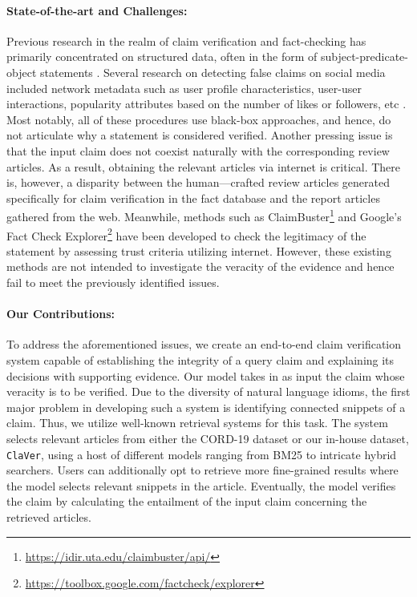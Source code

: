 \documentclass[11pt]{article}
\newcommand{\dataset}{\texttt{ClaVer}}
\begin{document}
\paragraph{State-of-the-art and Challenges:} Previous research in the realm of claim verification and fact-checking has primarily concentrated on structured data, often in the form of subject-predicate-object statements \cite{dong2015knowledge,nakashole2014language}. Several research on detecting false claims on social media included network metadata such as user profile characteristics, user-user interactions, popularity attributes based on the number of likes or followers, etc \cite{kumar2016disinformation,qazvinian2011rumor}. Most notably, all of these procedures use black-box approaches, and hence, do not articulate why a statement is considered verified. Another pressing issue is that the input claim does not coexist naturally with the corresponding review articles.
As a result, obtaining the relevant articles via internet is critical.
There is, however, a disparity between the human—crafted review articles generated specifically for claim verification in the fact database and the report articles gathered from the web. Meanwhile, methods such as ClaimBuster\footnote{\url{https://idir.uta.edu/claimbuster/api/}} and Google's Fact Check Explorer\footnote{\url{https://toolbox.google.com/factcheck/explorer}} have been developed to check the legitimacy of the statement by assessing trust criteria utilizing internet. However, these existing methods are not intended to investigate the veracity of the evidence and hence fail to meet the previously identified issues. \\


\paragraph{Our Contributions:} To address the aforementioned issues, we create an end-to-end claim verification system capable of establishing the integrity of a query claim and explaining its decisions with supporting evidence. Our model takes in as input the claim whose veracity is to be verified. Due to the diversity of natural language idioms, the first major problem in developing such a system is identifying connected snippets of a claim. Thus, we utilize well-known retrieval systems for this task. The system selects relevant articles from either the CORD-19 dataset or our in-house dataset, \dataset, using a host of different models ranging from BM25 to intricate hybrid searchers. Users can additionally opt to retrieve more fine-grained results where the model selects relevant snippets in the article. Eventually, the model verifies the claim by calculating the entailment of the input claim concerning the retrieved articles.  
\\
\end{document}
